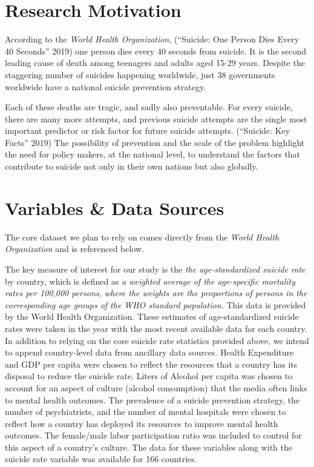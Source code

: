 \documentclass[]{article}
\begin{document}
\section{Research Motivation}\label{research-motivation}

According to the \emph{World Health Organization}, (``Suicide: One
Person Dies Every 40 Seconds'' 2019) one person dies every 40 seconds
from suicide. It is the second leading cause of death among teenagers
and adults aged 15-29 years. Despite the staggering number of suicides
happening worldwide, just 38 governments worldwide have a national
suicide prevention strategy.

Each of these deaths are tragic, and sadly also preventable. For every
suicide, there are many more attempts, and previous suicide attempts are
the single most important predictor or risk factor for future suicide
attempts. (``Suicide: Key Facts'' 2019) The possibility of prevention
and the scale of the problem highlight the need for policy makers, at
the national level, to understand the factors that contribute to suicide
not only in their own nations but also globally.

\section{Variables \& Data Sources}\label{variables-data-sources}

The core dataset we plan to rely on comes directly from the \emph{World
Health Organization} and is referenced below. 


The key measure of
interest for our study is the \emph{the age-standardized suicide rate}
by country, which is defined as \emph{a weighted average of the
age-specific mortality rates per 100,000 persons, where the weights are
the proportions of persons in the corresponding age groups of the WHO
standard population.} This data is provided by the World Health Organization.
These estimates of
age-standardized suicide rates were taken in the year with the most recent available data for each country.
In addition to
relying on the core suicide rate statistics provided above, we
intend to append country-level data
from ancillary data sources. Health Expenditure and GDP per capita were chosen
 to reflect the resources that a country has its disposal to reduce the suicide rate.
Liters of Alcohol per capita was chosen to account for an aspect of culture 
(alcohol consumption) that the media often links to mental health outcomes.
The prevalence of a suicide prevention strategy, the number of psychiatrists, and the number of mental 
hospitals were chosen to reflect how a country has deployed its resources to improve mental health outcomes.
The female/male labor participation ratio was included to control for this aspect of a country’s culture.
The data for these variables along with the suicide rate variable was available for 166 countries.
\end{document}
